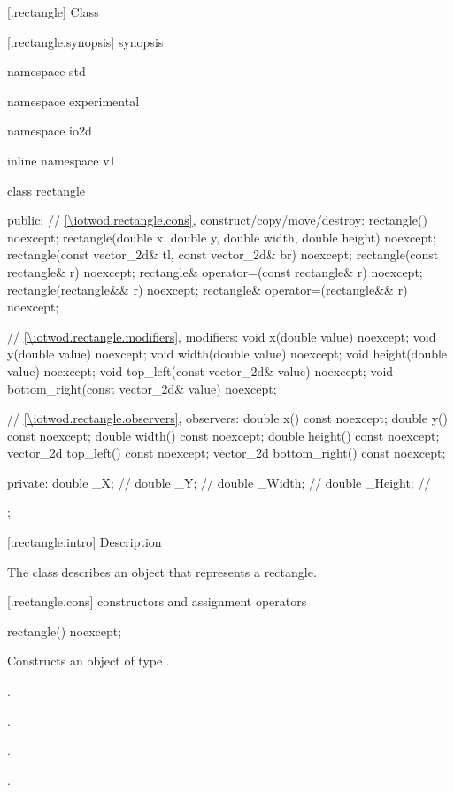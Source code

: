  [\iotwod.rectangle] {Class }

 [\iotwod.rectangle.synopsis] { synopsis}

\begin{codeblock}
namespace std { namespace experimental { namespace io2d { inline namespace v1 {
  class rectangle {
  public:
    // \ref{\iotwod.rectangle.cons}, construct/copy/move/destroy:
    rectangle() noexcept;
    rectangle(double x, double y, double width, double height) noexcept;
    rectangle(const vector_2d& tl, const vector_2d& br) noexcept;
    rectangle(const rectangle& r) noexcept;
    rectangle& operator=(const rectangle& r) noexcept;
    rectangle(rectangle&& r) noexcept;
    rectangle& operator=(rectangle&& r) noexcept;

    // \ref{\iotwod.rectangle.modifiers}, modifiers:
    void x(double value) noexcept;
    void y(double value) noexcept;
    void width(double value) noexcept;
    void height(double value) noexcept;
    void top_left(const vector_2d& value) noexcept;
    void bottom_right(const vector_2d& value) noexcept;
    
    // \ref{\iotwod.rectangle.observers}, observers:
    double x() const noexcept;
    double y() const noexcept;
    double width() const noexcept;
    double height() const noexcept;
    vector_2d top_left() const noexcept;
    vector_2d bottom_right() const noexcept;
    
  private:
    double _X;      // \expos
    double _Y;      // \expos
    double _Width;  // \expos
    double _Height; // \expos
  };
} } } }
\end{codeblock}

 [\iotwod.rectangle.intro] { Description}

\pnum
{}
The class  describes an object that represents a rectangle.

 [\iotwod.rectangle.cons] { constructors and assignment operators}

\begin{itemdecl}
rectangle() noexcept;
\end{itemdecl}
\begin{itemdescr}
	\pnum
	\effects
	Constructs an object of type .
	
	\pnum
	\postconditions
	.
	
	\pnum
	.
	
	\pnum
	.
	
	\pnum
	.

\end{itemdescr}

